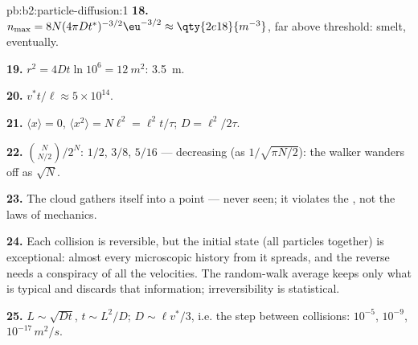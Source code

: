 \begin{solution}{pb:b2:particle-diffusion:1}
\textbf{18.} $n_{\max} = 8N(4\pi Dt^*)^{-3/2}\eu^{-3/2} \approx \qty{2e18}{m^{-3}}$,
far above threshold: smelt, eventually.

\textbf{19.} $r^2 = 4Dt\ln 10^6 = \qty{12}{m^2}$: \qty{3.5}{m}.

\textbf{20.} $v^*t/\ell \approx 5 \times 10^{14}$.

\textbf{21.} $\langle x\rangle = 0$, $\langle x^2\rangle = N\ell^2 = \ell^2 t/\tau$;
$D = \ell^2/2\tau$.

\textbf{22.} $\binom{N}{N/2}/2^N$: $1/2$, $3/8$, $5/16$ --- decreasing
(as $1/\sqrt{\pi N/2}$): the walker wanders off as $\sqrt N$.

\textbf{23.} The cloud gathers itself into a point --- never seen; it
violates the , not the laws of mechanics.

\textbf{24.} Each collision is reversible, but the initial state (all
particles together) is exceptional: almost every microscopic history
from it spreads, and the reverse needs a conspiracy of all the
velocities. The random-walk average keeps only what is typical and
discards that information; irreversibility is statistical.

\textbf{25.} $L \sim \sqrt{Dt}$, $t \sim L^2/D$; $D \sim \ell v^*/3$, i.e.
the step between collisions: $10^{-5}$, $10^{-9}$, $10^{-17}\,\unit{m^2/s}$.
\end{solution}

